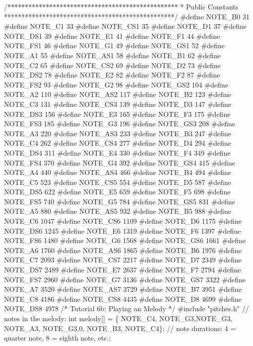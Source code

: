 \documentclass[10pt,english]{article}
\begin{document}
\nwenddocs{}\endmoddef
/*************************************************
 * Public Constants
 *************************************************/
#define NOTE_B0  31
#define NOTE_C1  33
#define NOTE_CS1 35
#define NOTE_D1  37
#define NOTE_DS1 39
#define NOTE_E1  41
#define NOTE_F1  44
#define NOTE_FS1 46
#define NOTE_G1  49
#define NOTE_GS1 52
#define NOTE_A1  55
#define NOTE_AS1 58
#define NOTE_B1  62
#define NOTE_C2  65
#define NOTE_CS2 69
#define NOTE_D2  73
#define NOTE_DS2 78
#define NOTE_E2  82
#define NOTE_F2  87
#define NOTE_FS2 93
#define NOTE_G2  98
#define NOTE_GS2 104
#define NOTE_A2  110
#define NOTE_AS2 117
#define NOTE_B2  123
#define NOTE_C3  131
#define NOTE_CS3 139
#define NOTE_D3  147
#define NOTE_DS3 156
#define NOTE_E3  165
#define NOTE_F3  175
#define NOTE_FS3 185
#define NOTE_G3  196
#define NOTE_GS3 208
#define NOTE_A3  220
#define NOTE_AS3 233
#define NOTE_B3  247
#define NOTE_C4  262
#define NOTE_CS4 277
#define NOTE_D4  294
#define NOTE_DS4 311
#define NOTE_E4  330
#define NOTE_F4  349
#define NOTE_FS4 370
#define NOTE_G4  392
#define NOTE_GS4 415
#define NOTE_A4  440
#define NOTE_AS4 466
#define NOTE_B4  494
#define NOTE_C5  523
#define NOTE_CS5 554
#define NOTE_D5  587
#define NOTE_DS5 622
#define NOTE_E5  659
#define NOTE_F5  698
#define NOTE_FS5 740
#define NOTE_G5  784
#define NOTE_GS5 831
#define NOTE_A5  880
#define NOTE_AS5 932
#define NOTE_B5  988
#define NOTE_C6  1047
#define NOTE_CS6 1109
#define NOTE_D6  1175
#define NOTE_DS6 1245
#define NOTE_E6  1319
#define NOTE_F6  1397
#define NOTE_FS6 1480
#define NOTE_G6  1568
#define NOTE_GS6 1661
#define NOTE_A6  1760
#define NOTE_AS6 1865
#define NOTE_B6  1976
#define NOTE_C7  2093
#define NOTE_CS7 2217
#define NOTE_D7  2349
#define NOTE_DS7 2489
#define NOTE_E7  2637
#define NOTE_F7  2794
#define NOTE_FS7 2960
#define NOTE_G7  3136
#define NOTE_GS7 3322
#define NOTE_A7  3520
#define NOTE_AS7 3729
#define NOTE_B7  3951
#define NOTE_C8  4186
#define NOTE_CS8 4435
#define NOTE_D8  4699
#define NOTE_DS8 4978
\nwendcode{}\nwdocspar
\nwenddocs{}\endmoddef
/* Tutorial 6b: Playing an Melody */
#include "pitches.h"
// notes in the melody:
int melody[] = \{    NOTE_C4, NOTE_G3,NOTE_G3, NOTE_A3, NOTE_G3,0, NOTE_B3, NOTE_C4\};
// note durations: 4 = quarter note, 8 = eighth note, etc.:
\end{document}
